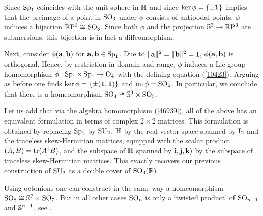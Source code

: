 \begin{example}
    Since $\Sp_1$ coincides with the unit sphere in $\bbH$ and since $\ker\phi=\{\pm\bf{1}\}$ implies that the preimage of a point in $\SO_3$ under $\phi$ consists of antipodal points, $\phi$ induces a bijection $\RP^3\cong \SO_3$. Since both $\phi$ and the projection $\bbS^3\to\RP^3$ are submersions, this bijection is in fact a diffeomorphism.

    Next, consider $\phi(\bf{a},\bf{b})$ for $\bf{a},\bf{b}\in\Sp_1$. Due to $\lVert \bf{a}\rVert^2=\lVert \bf{b}\rVert^2=1$, $\phi(\bf{a},\bf{b})$ is orthogonal. Hence, by restriction in domain and range, $\phi$ induces a Lie group homomorphism $\phi:\Sp_1\times\Sp_1\to \Or_4$ with the defining equation (\ref{10423}). Arguing as before one finds $\ker\phi=\{\pm(\bf{1},\bf{1})\}$ and $\im\phi=\SO_4$. In particular, we conclude that there is a homeomorphism $\SO_4\cong \bbS^3\times \SO_3$.

    Let us add that via the algebra homomorphism (\ref{46939}), all of the above has an equivalent formulation in terms of complex $2\times 2$ matrices. This formulation is obtained by replacing $\Sp_1$ by $\SU_2$, $\bbH$ by the real vector space spanned by $\rmI_2$ and the traceless skew-Hermitian matrices, equipped with the scalar product $(A,B)=\tr(A^\dagger B)$, and the subspace of $\bbH$ spanned by $\bf{i},\bf{j},\bf{k})$ by the subspace of traceless skew-Hermitian matrices. This exactly recovers our previous construction of $\SU_2$ as a double cover of $\SO_3(\bbR)$.
\end{example}

\begin{rem}
    Using octonions one can construct in the same way a homeomorphism $\SO_8\cong \bbS^7\times \SO_7$. But in all other cases $\SO_n$ is only a `twisted product' of $\SO_{n-1}$ and $\bbS^{n-1}$, see \cite[Cor.~4D.3]{Hatcher}.
\end{rem}




